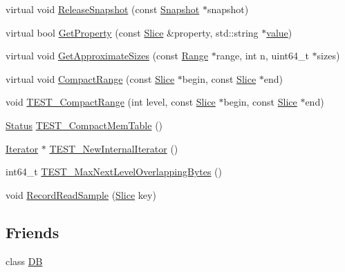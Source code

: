 \begin{DoxyCompactItemize}
\item 
virtual void \mbox{\hyperlink{classleveldb_1_1_d_b_impl_a6c0b6abfc9a30cc8e5412d4fc3e8c886}{Release\+Snapshot}} (const \mbox{\hyperlink{classleveldb_1_1_snapshot}{Snapshot}} $\ast$snapshot)
\item 
virtual bool \mbox{\hyperlink{classleveldb_1_1_d_b_impl_ad1a2023ce171c8f8476664f5b1cbab4d}{Get\+Property}} (const \mbox{\hyperlink{classleveldb_1_1_slice}{Slice}} \&property, std\+::string $\ast$\mbox{\hyperlink{version__set_8cc_a38c8b88c432e666ad10b0c5573e1160a}{value}})
\item 
virtual void \mbox{\hyperlink{classleveldb_1_1_d_b_impl_af08e218d92064699942c195ce0f06010}{Get\+Approximate\+Sizes}} (const \mbox{\hyperlink{structleveldb_1_1_range}{Range}} $\ast$range, int n, uint64\+\_\+t $\ast$sizes)
\item 
virtual void \mbox{\hyperlink{classleveldb_1_1_d_b_impl_aa6df0739fc0b49380c284347e411b8ed}{Compact\+Range}} (const \mbox{\hyperlink{classleveldb_1_1_slice}{Slice}} $\ast$begin, const \mbox{\hyperlink{classleveldb_1_1_slice}{Slice}} $\ast$end)
\item 
void \mbox{\hyperlink{classleveldb_1_1_d_b_impl_a63fcb49466b689a534ba77d32cf84f99}{T\+E\+S\+T\+\_\+\+Compact\+Range}} (int level, const \mbox{\hyperlink{classleveldb_1_1_slice}{Slice}} $\ast$begin, const \mbox{\hyperlink{classleveldb_1_1_slice}{Slice}} $\ast$end)
\item 
\mbox{\hyperlink{classleveldb_1_1_status}{Status}} \mbox{\hyperlink{classleveldb_1_1_d_b_impl_a8642703fd1398cd8e3f5f24ee0b9da23}{T\+E\+S\+T\+\_\+\+Compact\+Mem\+Table}} ()
\item 
\mbox{\hyperlink{classleveldb_1_1_iterator}{Iterator}} $\ast$ \mbox{\hyperlink{classleveldb_1_1_d_b_impl_adba5bf4252bd94f7db50e62921b7ba53}{T\+E\+S\+T\+\_\+\+New\+Internal\+Iterator}} ()
\item 
int64\+\_\+t \mbox{\hyperlink{classleveldb_1_1_d_b_impl_af621636048b8d3cfaa21238fe26ef0ca}{T\+E\+S\+T\+\_\+\+Max\+Next\+Level\+Overlapping\+Bytes}} ()
\item 
void \mbox{\hyperlink{classleveldb_1_1_d_b_impl_a254ae98e3425046c28ed0aa6d78b37d8}{Record\+Read\+Sample}} (\mbox{\hyperlink{classleveldb_1_1_slice}{Slice}} key)
\end{DoxyCompactItemize}
\subsection*{Friends}
\begin{DoxyCompactItemize}
\item 
class \mbox{\hyperlink{classleveldb_1_1_d_b_impl_ad22eb7a23cbf34de526efa966c578d4a}{DB}}
\end{DoxyCompactItemize}
